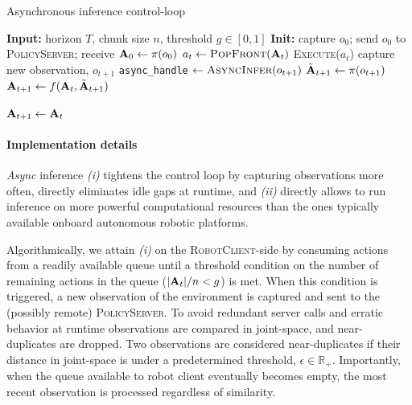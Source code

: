 \begin{algorithm}
  \caption{Asynchronous inference control-loop}
  \label{alg:robotclient}
  \begin{algorithmic}[1]
    \State \textbf{Input:} horizon $T$, chunk size $n$, threshold $g\in[0,1]$
    \State \textbf{Init:} capture $o_0$; send $o_0$ to \textsc{PolicyServer};
           receive $\mathbf{A}_0 \gets \pi(o_0)$
        \State $a_t \gets \textsc{PopFront}(\mathbf{A}_t)$
        \State \textsc{Execute}($a_t$) 
         
            \State capture new observation, $o_{t+1}$
             
                \State \texttt{async\_handle} $\gets \textsc{AsyncInfer}(o_{t+1})$ 
                \State $\tilde{\mathbf{A}}_{t+1} \gets \pi(o_{t+1})$ 
                \State $\mathbf{A}_{t+1} \gets f(\mathbf{A}_t,\tilde{\mathbf{A}}_{t+1})$ 
                
            \EndIf
        \EndIf
            \State $\mathbf{A}_{t+1} \gets \mathbf{A}_t$ 
        \EndIf
    \EndFor
  \end{algorithmic}
  \label{alg:async-inference}
\end{algorithm}


\paragraph{Implementation details}
\textit{Async} inference \emph{(i)} tightens the control loop by capturing observations more often, directly eliminates idle gaps at runtime, and \emph{(ii)} directly allows to run inference on more powerful computational resources than the ones typically available onboard autonomous robotic platforms.

Algorithmically, we attain \emph{(i)} on the \textsc{RobotClient}-side by consuming actions from a readily available queue until a threshold condition on the number of remaining actions in the queue (\(\vert \mathbf{A}_t \vert / n < g \)) is met. When this condition is triggered, a new observation of the environment is captured and sent to the (possibly remote) \textsc{PolicyServer}. 
To avoid redundant server calls and erratic behavior at runtime observations are compared in joint-space, and near-duplicates are dropped.
Two observations are considered near-duplicates if their distance in joint-space is under a predetermined threshold, \( \epsilon \in \mathbb R_+\).
Importantly, when the queue available to robot client eventually becomes empty, the most recent observation is processed regardless of similarity.

